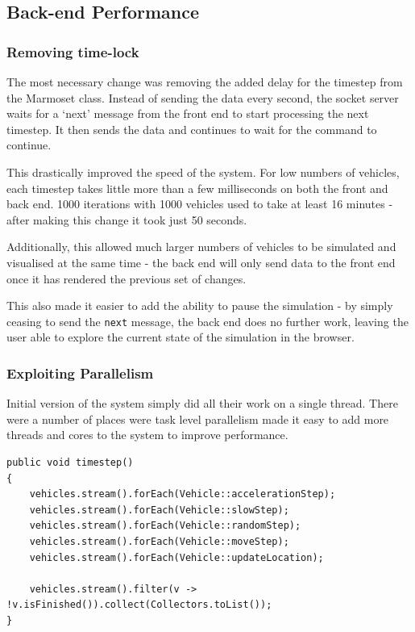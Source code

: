 \documentclass[ %
                    author={Alexander Hill},
                supervisor={Dr. Benjamin Sach},
                    degree={MEng},
                     title={MARMOSET},
                  subtitle={Multi-Agent Route Management using Online Simulation for Efficient Transportation},
                      type={research},
                      year={2016} ]{dissertation}
\begin{document}
\subsection{Back-end Performance}

\subsubsection{Removing time-lock}

The most necessary change was removing the added delay for the timestep from the
Marmoset class. Instead of sending the data every second, the socket server
waits for a `next' message from the front end to start processing the next
timestep. It then sends the data and continues to wait for the command to
continue.

This drastically improved the speed of the system. For low numbers of vehicles,
each timestep takes little more than a few milliseconds on both the front and
back end. 1000 iterations with 1000 vehicles used to take at least 16 minutes -
after making this change it took just 50 seconds.

Additionally, this allowed much larger numbers of vehicles to be simulated and
visualised at the same time - the back end will only send data to the front end
once it has rendered the previous set of changes.

This also made it easier to add the ability to pause the simulation - by simply
ceasing to send the \texttt{next} message, the back end does no further work,
leaving the user able to explore the current state of the simulation in the
browser.

\subsubsection{Exploiting Parallelism}

Initial version of the system simply did all their work on a single thread.
There were a number of places were task level parallelism made it easy to add
more threads and cores to the system to improve performance.

\begin{minipage}{\linewidth}
\begin{lstlisting}[caption={The single-threaded \texttt{timestep} function},
    label=lst:timestep]
public void timestep()
{
    vehicles.stream().forEach(Vehicle::accelerationStep);
    vehicles.stream().forEach(Vehicle::slowStep);
    vehicles.stream().forEach(Vehicle::randomStep);
    vehicles.stream().forEach(Vehicle::moveStep);
    vehicles.stream().forEach(Vehicle::updateLocation);

    vehicles.stream().filter(v -> !v.isFinished()).collect(Collectors.toList());
}
\end{lstlisting}
\end{minipage}
\end{document}
